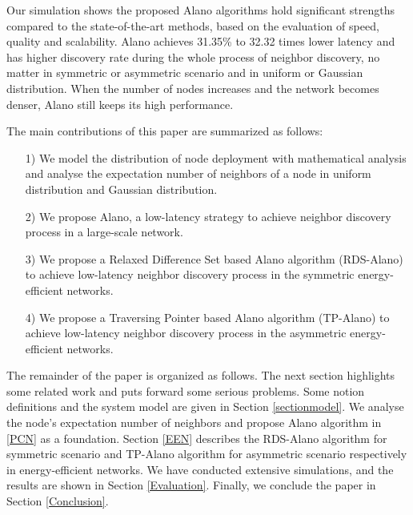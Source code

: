 Our simulation shows the proposed Alano algorithms
hold significant strengths compared to the state-of-the-art methods,
based on the evaluation of speed, quality and scalability.%
Alano achieves 31.35\% to 32.32 times lower latency
and has higher discovery rate during the whole process of neighbor discovery, 
no matter in symmetric or asymmetric scenario and in uniform or Gaussian distribution.
When the number of nodes increases and the network becomes denser, 
Alano still keeps its high performance. 


The main contributions of this paper are summarized as follows:
\begin{itemize}
\item[1)] We model the distribution of node deployment with mathematical analysis 
and analyse the expectation number of neighbors of a node in uniform distribution and Gaussian
distribution.
\item[2)] We propose Alano, a low-latency strategy to achieve neighbor discovery process
in a large-scale network.
\item[3)] We propose a Relaxed Difference Set based Alano algorithm (RDS-Alano) 
to achieve low-latency neighbor discovery process in the symmetric energy-efficient networks. 
\item[4)] We propose a Traversing Pointer based Alano algorithm (TP-Alano) to
achieve low-latency neighbor discovery process in the asymmetric energy-efficient networks. 
\end{itemize}


The remainder of the paper is organized as follows.
The next section highlights some related work and 
puts forward some serious problems. 
Some notion definitions and the system model are given in Section \ref{sectionmodel}. 
We analyse the node's expectation number of neighbors and 
propose Alano algorithm in \ref{PCN} as a foundation.
Section \ref{EEN} describes the RDS-Alano algorithm for 
symmetric scenario and TP-Alano algorithm for asymmetric scenario
respectively in energy-efficient networks.
We have conducted extensive simulations, and the results are shown in Section
\ref{Evaluation}. Finally, we conclude the paper in Section
\ref{Conclusion}.

